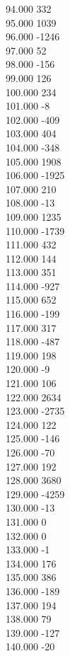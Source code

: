 { 94.000	332 \\
 95.000	1039 \\
 96.000	-1246 \\
 97.000	52 \\
 98.000	-156 \\
 99.000	126 \\
 100.000	234 \\
 101.000	-8 \\
 102.000	-409 \\
 103.000	404 \\
 104.000	-348 \\
 105.000	1908 \\
 106.000	-1925 \\
 107.000	210 \\
 108.000	-13 \\
 109.000	1235 \\
 110.000	-1739 \\
 111.000	432 \\
 112.000	144 \\
 113.000	351 \\
 114.000	-927 \\
 115.000	652 \\
 116.000	-199 \\
 117.000	317 \\
 118.000	-487 \\
 119.000	198 \\
 120.000	-9 \\
 121.000	106 \\
 122.000	2634 \\
 123.000	-2735 \\
 124.000	122 \\
 125.000	-146 \\
 126.000	-70 \\
 127.000	192 \\
 128.000	3680 \\
 129.000	-4259 \\
 130.000	-13 \\
 131.000	0 \\
 132.000	0 \\
 133.000	-1 \\
 134.000	176 \\
 135.000	386 \\
 136.000	-189 \\
 137.000	194 \\
 138.000	79 \\
 139.000	-127 \\
 140.000	-20 \\
}
